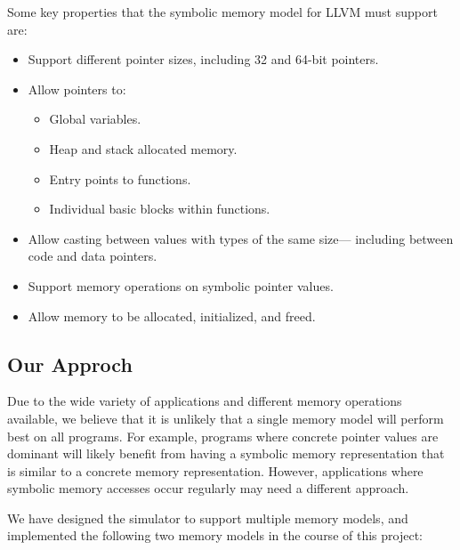 \documentclass{article}
\begin{document}
Some key properties that the symbolic memory model for LLVM must support are:
\begin{itemize}

  \item Support different pointer sizes, including 32 and 64-bit pointers.

  \item Allow pointers to:
    \begin{itemize}
      \item Global variables.
      \item Heap and stack allocated memory.
      \item Entry points to functions.
      \item Individual basic blocks within functions.

    \end{itemize}

  \item Allow casting between values with types of the same size--- including
          between code and data pointers.

  \item Support memory operations on symbolic pointer values.

  \item Allow memory to be allocated, initialized, and freed.

\end{itemize}

\subsection{Our Approch}

Due to the wide variety of applications and different memory operations
available, we believe that it is unlikely that a single memory model will
perform best on all programs.  For example, programs where concrete pointer
values are dominant will likely benefit from having a symbolic memory
representation that is similar to a concrete memory representation.  However,
applications where symbolic memory accesses occur regularly may need a
different approach.

We have designed the simulator to support multiple memory models, and implemented
the following two memory models in the course of this project:
\end{document}
